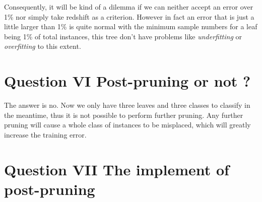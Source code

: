 \documentclass[11pt]{article}
\begin{document}
Consequently, it will be kind of a dilemma if we can neither accept an
error over 1\% nor simply take redshift as a criterion. However in fact
an error that is just a little larger than 1\% is quite normal with the
minimum sample numbers for a leaf being 1\% of total instances, this
tree don't have problems like \emph{underfitting} or \emph{overfitting}
to this extent.

    \section{Question VI Post-pruning or not
?}\label{question-vi-post-pruning-or-not}

    The answer is no. Now we only have three leaves and three classes to
classify in the meantime, thus it is not possible to perform further
pruning. Any further pruning will cause a whole class of instances to be
misplaced, which will greatly increase the training error.

    \section{Question VII The implement of
post-pruning}\label{question-vii-the-implement-of-post-pruning}


        
    
    
\end{document}
